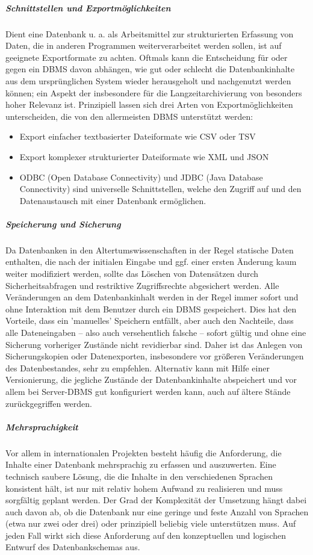 \subparagraph{Schnittstellen und Exportmöglichkeiten}
Dient eine Datenbank u. a. als Arbeitsmittel zur strukturierten Erfassung von Daten, die in anderen Programmen weiterverarbeitet werden sollen, ist auf geeignete Exportformate zu achten. Oftmals kann die Entscheidung für oder gegen ein DBMS davon abhängen, wie gut oder schlecht die Datenbankinhalte aus dem ursprünglichen System wieder herausgeholt und nachgenutzt werden können; ein Aspekt der insbesondere für die Langzeitarchivierung von besonders hoher Relevanz ist. Prinzipiell lassen sich drei Arten von Exportmöglichkeiten unterscheiden, die von den allermeisten DBMS unterstützt werden:
\begin{itemize}
	\item Export einfacher textbasierter Dateiformate wie CSV oder TSV 
	\item Export komplexer strukturierter Dateiformate wie XML und JSON
	\item ODBC (Open Database Connectivity) und JDBC (Java Database Connectivity) sind universelle Schnittstellen, welche den Zugriff auf und den Datenaustausch mit einer Datenbank ermöglichen.
\end{itemize}


\subparagraph{Speicherung und Sicherung}
Da Datenbanken in den Altertumswissenschaften in der Regel statische Daten enthalten, die nach der initialen Eingabe und ggf. einer ersten Änderung kaum weiter modifiziert werden, sollte das Löschen von Datensätzen durch Sicherheitsabfragen und restriktive Zugriffsrechte abgesichert werden. Alle Veränderungen an dem Datenbankinhalt werden in der Regel immer sofort und ohne Interaktion mit dem Benutzer durch ein DBMS gespeichert. Dies hat den Vorteile, dass ein ’manuelles’ Speichern entfällt, aber auch den Nachteile, dass alle Dateneingaben -- also auch versehentlich falsche -- sofort gültig und ohne eine Sicherung vorheriger Zustände nicht revidierbar sind. Daher ist das Anlegen von Sicherungskopien oder Datenexporten, insbesondere vor größeren Veränderungen des Datenbestandes, sehr zu empfehlen. Alternativ kann mit Hilfe einer Versionierung, die jegliche Zustände der Datenbankinhalte abspeichert und vor allem bei Server-DBMS gut konfiguriert werden kann, auch auf ältere Stände zurückgegriffen werden.

\subparagraph{Mehrsprachigkeit}
Vor allem in internationalen Projekten besteht häufig die Anforderung, die Inhalte einer Datenbank mehrsprachig zu erfassen und auszuwerten. Eine technisch saubere Lösung, die die Inhalte in den verschiedenen Sprachen konsistent hält, ist nur mit relativ hohem Aufwand zu realisieren und muss sorgfältig geplant werden. Der Grad der Komplexität der Umsetzung hängt dabei auch davon ab, ob die Datenbank nur eine geringe und feste Anzahl von Sprachen (etwa nur zwei oder drei) oder prinzipiell beliebig viele unterstützen muss. Auf jeden Fall wirkt sich diese Anforderung auf den konzeptuellen und logischen Entwurf des Datenbankschemas aus.

